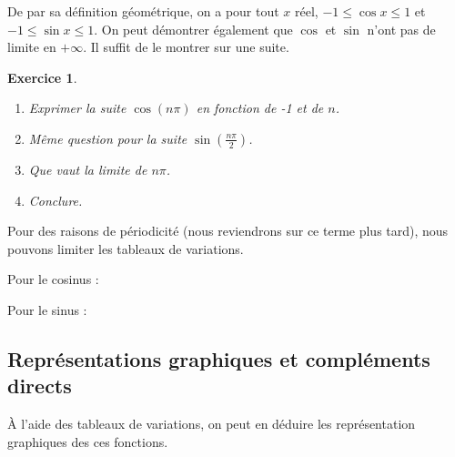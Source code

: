\documentclass[11pt,a4paper,french]{article}
\theoremstyle{break}
\theoremstyle{plain}
\newtheorem{exerciceT}{Exercice}
\theoremstyle{nonumberplain}
\theoremstyle{nonumberbreak}
\newenvironment{exercice}{\begin{framed}\begin{exerciceT}}{\end{exerciceT}\end{framed}}
\begin{document}
De par sa définition géométrique, on a pour tout $x$ réel, $-1\leqslant
\cos x \leqslant 1$ et $-1 \leqslant \sin x \leqslant 1$. On peut
démontrer également que $\cos$ et $\sin$ n'ont pas de limite en
$+\infty$. Il suffit de le montrer sur une suite.

\begin{exercice}
  \begin{enumerate}
    \item Exprimer la suite $\cos(n\pi)$ en fonction de -1 et de $n$.
    \item Même question pour la suite $\sin\left(\frac{n\pi}2\right)$.
    \item Que vaut la limite de $n\pi$.
    \item Conclure.
  \end{enumerate}
\end{exercice}

Pour des raisons de périodicité (nous reviendrons sur ce terme plus
tard), nous pouvons limiter les tableaux de variations.

Pour le cosinus :
\begin{center}
\end{center}

Pour le sinus :
\begin{center}
\end{center}

\subsection{Représentations graphiques et compléments directs}

À l'aide des tableaux de variations, on peut en déduire les
représentation graphiques des ces fonctions.

\begin{center}
\end{center}
\end{document}
